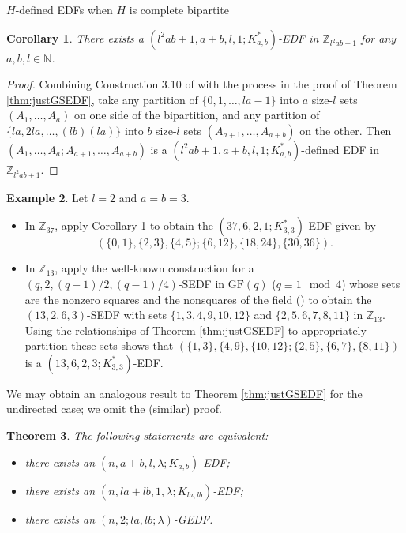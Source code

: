 \documentclass[12pt, a4paper]{article}
\newtheorem{theorem}{Theorem}[section]
\newtheorem{corollary}[theorem]{Corollary}
\theoremstyle{definition}
\newtheorem{example}[theorem]{Example}
\begin{document}
\begin{section}{$H$-defined EDFs when $H$ is complete bipartite}
\begin{corollary}\label{cor:Kab*}
There exists a $(l^2 ab+1, a+b,l,1; K_{a,b}^*)$-EDF in $\mathbb{Z}_{l^2 ab+1}$ for any $a,b,l \in \mathbb{N}$.
\end{corollary}
\begin{proof}
Combining Construction 3.10 of \cite{HucPatWEDF} with the process in the proof of Theorem \ref{thm:justGSEDF}, take any partition of $\{0,1,\ldots,la-1\}$ into $a$ size-$l$ sets $(A_1,\ldots,A_a)$ on one side of the bipartition, and any partition of $\{la,2la,\ldots, (lb)(la)\}$ into $b$ size-$l$ sets $(A_{a+1},\ldots,A_{a+b})$ on the other.  Then $(A_1,\ldots,A_a; A_{a+1},\ldots, A_{a+b})$ is a $(l^2 ab+1,a+b,l,1; K_{a,b}^*)$-defined EDF in $\mathbb{Z}_{l^2 ab+1}$.
\end{proof}

\begin{example}
Let $l=2$ and $a=b=3$.
\begin{itemize}
\item[(i)] In $\mathbb{Z}_{37}$, apply Corollary \ref{cor:Kab*} to obtain the $(37,6,2,1; K_{3,3}^*)$-EDF given by 
$$(\{0,1\}, \{2,3\}, \{4,5\}; \{6,12\}, \{18,24\},\{30,36\}).$$
\item[(ii)] In $\mathbb{Z}_{13}$, apply the well-known  construction for a $(q,2,(q-1)/2,(q-1)/4)$-SEDF in $\mathrm{GF}(q)$ ($q \equiv 1 \mod 4$) whose sets are the nonzero squares and the nonsquares of the field (\cite{HucPatSEDF}) to obtain the $(13,2,6,3)$-SEDF with sets $\{ 1,3,4,9,10,12\}$ and $ \{2,5,6,7,8,11\}$ in $\mathbb{Z}_{13}$.  Using the relationships of Theorem \ref{thm:justGSEDF} to appropriately partition these sets shows that $(\{1,3\}, \{4,9\}, \{10,12\}; \{2,5\}, \{6,7\}, \{8,11\})$ is a $(13,6,2,3; K_{3,3}^*)$-EDF.
\end{itemize}
\end{example}

We may obtain an analogous result to Theorem \ref{thm:justGSEDF} for the undirected case; we omit the (similar) proof.

\begin{theorem}\label{thm:justGEDF}
The following statements are equivalent:
\begin{itemize}
\item[(i)] there exists an $(n,a+b,l,\lambda; K_{a,b})$-EDF;
\item[(ii)] there exists an $(n, la+lb,1,\lambda; K_{la,lb})$-EDF;
\item[(iii)] there exists an $(n,2;la,lb;\lambda)$-GEDF.
\end{itemize}
\end{theorem}


\end{section}
\end{document}
